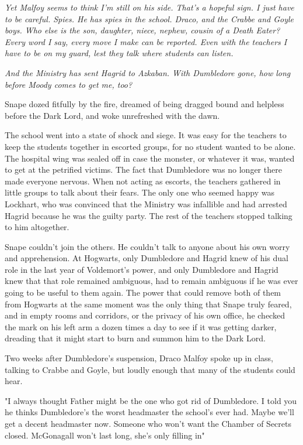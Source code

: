 \emph{Yet Malfoy seems to think I'm still on his side. That's a hopeful sign. I just have to be careful. Spies. He has spies in the school. Draco, and the Crabbe and Goyle boys. Who else is the son, daughter, niece, nephew, cousin of a Death Eater? Every word I say, every move I make can be reported. Even with the teachers I have to be on my guard, lest they talk where students can listen.}

\emph{And the Ministry has sent Hagrid to Azkaban. With Dumbledore gone, how long before Moody comes to get me, too?}

Snape dozed fitfully by the fire, dreamed of being dragged bound and helpless before the Dark Lord, and woke unrefreshed with the dawn.

The school went into a state of shock and siege. It was easy for the teachers to keep the students together in escorted groups, for no student wanted to be alone. The hospital wing was sealed off in case the monster, or whatever it was, wanted to get at the petrified victims. The fact that Dumbledore was no longer there made everyone nervous. When not acting as escorts, the teachers gathered in little groups to talk about their fears. The only one who seemed happy was Lockhart, who was convinced that the Ministry was infallible and had arrested Hagrid because he was the guilty party. The rest of the teachers stopped talking to him altogether.

Snape couldn't join the others. He couldn't talk to anyone about his own worry and apprehension. At Hogwarts, only Dumbledore and Hagrid knew of his dual role in the last year of Voldemort's power, and only Dumbledore and Hagrid knew that that role remained ambiguous, had to remain ambiguous if he was ever going to be useful to them again. The power that could remove both of them from Hogwarts at the same moment was the only thing that Snape truly feared, and in empty rooms and corridors, or the privacy of his own office, he checked the mark on his left arm a dozen times a day to see if it was getting darker, dreading that it might start to burn and summon him to the Dark Lord.

Two weeks after Dumbledore's suspension, Draco Malfoy spoke up in class, talking to Crabbe and Goyle, but loudly enough that many of the students could hear.

"I always thought Father might be the one who got rid of Dumbledore. I told you he thinks Dumbledore's the worst headmaster the school's ever had. Maybe we'll get a decent headmaster now. Someone who won't want the Chamber of Secrets closed. McGonagall won't last long, she's only filling in{\el}"

